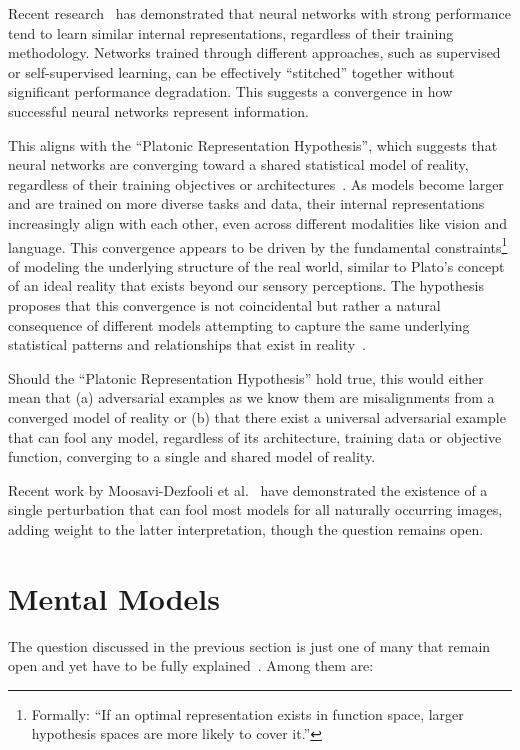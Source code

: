 \documentclass[a4paper, oneside]{discothesis}
\begin{document}
Recent research~\cite{bansal2021revisiting} has demonstrated that neural networks with strong performance tend to learn similar internal representations, regardless of their training methodology. Networks trained through different approaches, such as supervised or self-supervised learning, can be effectively ``stitched'' together without significant performance degradation. This suggests a convergence in how successful neural networks represent information.

This aligns with the ``Platonic Representation Hypothesis'', which suggests that neural networks are converging toward a shared statistical model of reality, regardless of their training objectives or architectures~\cite{huh2024platonic}. As models become larger and are trained on more diverse tasks and data, their internal representations increasingly align with each other, even across different modalities like vision and language. This convergence appears to be driven by the fundamental constraints\footnote{Formally: ``If an optimal representation exists in function space, larger hypothesis spaces are more likely to cover it.''} of modeling the underlying structure of the real world, similar to Plato's concept of an ideal reality that exists beyond our sensory perceptions. The hypothesis proposes that this convergence is not coincidental but rather a natural consequence of different models attempting to capture the same underlying statistical patterns and relationships that exist in reality~\cite{huh2024platonic}. 

Should the ``Platonic Representation Hypothesis'' hold true, this would either mean that (a) adversarial examples as we know them are misalignments from a converged model of reality or (b) that there exist a universal adversarial example that can fool any model, regardless of its architecture, training data or objective function, converging to a single and shared model of reality.

Recent work by Moosavi-Dezfooli et al.\ \cite{moosavi2017universal} have demonstrated the existence of a single perturbation that can fool most models for all naturally occurring images, adding weight to the latter interpretation, though the question remains open.

\section{Mental Models}

The question discussed in the previous section is just one of many that remain open and yet have to be fully explained~\cite{shamir2021dimpled}. Among them are:
\end{document}
